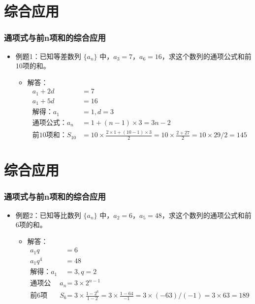 \documentclass{ctexbeamer}
\begin{document}
\section{综合应用}
\begin{frame}[t]
\frametitle{通项式与前n项和的综合应用}
\begin{itemize}
    \item 例题1：已知等差数列 $\{a_n\}$ 中，$a_3 = 7$，$a_6 = 16$，求这个数列的通项公式和前10项的和。
        \begin{itemize}
            \item 解答：
                \begin{align*}
                    a_1 + 2d &= 7 \\
                    a_1 + 5d &= 16 \\
                    \text{解得：} a_1 &= 1, d = 3 \\
                    \text{通项公式：} a_n &= 1 + (n - 1) × 3 = 3n - 2 \\
                    \text{前10项和：} S_{10} &= 10 × \frac{2 × 1 + (10 - 1) × 3}{2} = 10 × \frac{2 + 27}{2} = 10 × 29/2 = 145
                \end{align*}
        \end{itemize}
\end{itemize}
\end{frame}

\section{综合应用}
\begin{frame}[t]
\frametitle{通项式与前n项和的综合应用}
\begin{itemize}
    \item 例题2：已知等比数列 $\{a_n\}$ 中，$a_2 = 6$，$a_5 = 48$，求这个数列的通项公式和前6项的和。
        \begin{itemize}
            \item 解答：
                \begin{align*}
                    a_1q &= 6 \\
                    a_1q^4 &= 48 \\
                    \text{解得：} a_1 &= 3, q = 2 \\
                    \text{通项公式：} a_n &= 3 × 2^{n-1} \\
                    \text{前6项和：} S_6 &= 3 × \frac{1 - 2^6}{1 - 2} = 3 × \frac{1 - 64}{-1} = 3 × (-63)/(-1) = 3 × 63 = 189
                \end{align*}
        \end{itemize}
\end{itemize}
\end{frame}
\end{document}
